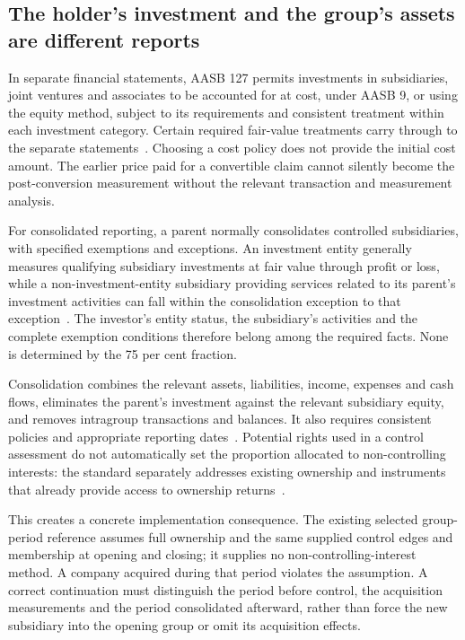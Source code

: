 \subsection{The holder's investment and the group's assets are different reports}

In separate financial statements, AASB 127 permits investments in subsidiaries, joint ventures and associates to be accounted for at cost, under AASB 9, or using the equity method, subject to its requirements and consistent treatment within each investment category. Certain required fair-value treatments carry through to the separate statements~\citep[paras.~3--10, 11A]{aasb127scope2022}. Choosing a cost policy does not provide the initial cost amount. The earlier price paid for a convertible claim cannot silently become the post-conversion measurement without the relevant transaction and measurement analysis.

For consolidated reporting, a parent normally consolidates controlled subsidiaries, with specified exemptions and exceptions. An investment entity generally measures qualifying subsidiary investments at fair value through profit or loss, while a non-investment-entity subsidiary providing services related to its parent's investment activities can fall within the consolidation exception to that exception~\citep[paras.~4--4B, 27--33]{aasb10control2026}. The investor's entity status, the subsidiary's activities and the complete exemption conditions therefore belong among the required facts. None is determined by the 75 per cent fraction.

Consolidation combines the relevant assets, liabilities, income, expenses and cash flows, eliminates the parent's investment against the relevant subsidiary equity, and removes intragroup transactions and balances. It also requires consistent policies and appropriate reporting dates~\citep[paras.~B86--B93]{aasb10control2026}. Potential rights used in a control assessment do not automatically set the proportion allocated to non-controlling interests: the standard separately addresses existing ownership and instruments that already provide access to ownership returns~\citep[paras.~B89--B91]{aasb10control2026}.

This creates a concrete implementation consequence. The existing selected group-period reference assumes full ownership and the same supplied control edges and membership at opening and closing; it supplies no non-controlling-interest method. A company acquired during that period violates the assumption. A correct continuation must distinguish the period before control, the acquisition measurements and the period consolidated afterward, rather than force the new subsidiary into the opening group or omit its acquisition effects.

